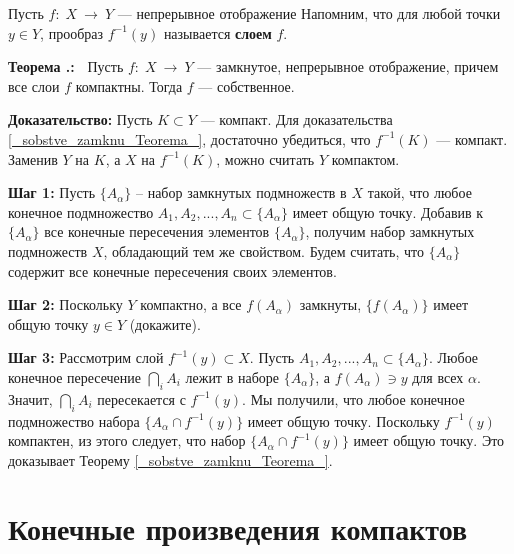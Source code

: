 \documentclass[12pt]{book}
\newcommand{\arrow}{{\:\longrightarrow\:}}
\def\endproof{\hbox{\vrule width 5pt height 5pt depth 0pt}}
\theoremstyle{upshape}
\theoremstyle{generic}
\theoremstyle{upshapenonumber}
\newcommand{\следствие}{%
     \refstepcounter{teorema}
     {\noindent\bf Следствие \thechapter.\arabic{teorema}:\ }}
\newcommand{\пример}{%
     \refstepcounter{teorema}
     {\noindent\bf Пример \thechapter.\arabic{teorema}:\ }}
\newcommand{\лемма}{%
     \refstepcounter{teorema}
     {\noindent\bf Лемма \thechapter.\arabic{teorema}:\ }}
\newcommand{\теорема}{%
     \refstepcounter{teorema}
     {\noindent\bf Теорема \thechapter.\arabic{teorema}:\ }}
\newcommand{\утверждение}{%
     \refstepcounter{teorema}
     {\noindent\bf Утверждение \thechapter.\arabic{teorema}:\ }}
\def\хфилл{\hfill}
\def\ноиндент{\noindent}
\def\бф{\bf}
\begin{document}
Пусть $f:\; X \arrow Y$ --- непрерывное отображение
Напомним, что для любой точки $y\in Y$, прообраз
$f^{-1}(y)$ называется {\бф слоем} $f$.

\хфилл


\теорема\label{_sobstve_zamknu_Teorema_}
Пусть $f:\; X \arrow Y$ --- замкнутое, непрерывное отображение,
причем все слои $f$ компактны. Тогда $f$ --- собственное.

\хфилл

\ноиндент
{\бф Доказательство:} 
Пусть $K\subset Y$ --- компакт.
Для доказательства \ref{_sobstve_zamknu_Teorema_},
достаточно убедиться, что $f^{-1}(K)$ --- компакт.
Заменив $Y$ на $K$, а $X$ на $f^{-1}(K)$, 
можно считать $Y$ компактом.

\хфилл

\ноиндент
{\бф Шаг 1:} Пусть $\{A_\alpha\}$ --
набор замкнутых подмножеств в $X$ такой, что любое конечное
подмножество $A_1, A_2, ... , A_n \subset \{A_\alpha\}$
имеет общую точку. Добавив к $\{A_\alpha\}$
все конечные пересечения элементов $\{A_\alpha\}$,
получим набор замкнутых подмножеств $X$,
обладающий тем же свойством. Будем считать,
что $\{A_\alpha\}$ содержит все конечные
пересечения своих элементов.

\хфилл

\ноиндент
{\бф Шаг 2:}
Поскольку $Y$ компактно, а все $f(A_\alpha)$
замкнуты, $\{ f(A_\alpha)\}$ имеет 
общую точку $y\in Y$ (докажите). 

\хфилл

\ноиндент
{\бф Шаг 3:} Рассмотрим слой $f^{-1}(y) \subset X$.
Пусть  $A_1, A_2, ... , A_n \subset \{A_\alpha\}$.
Любое конечное пересечение $\bigcap_i A_i$
лежит в наборе $\{A_\alpha\}$, а
$f(A_\alpha)\ni y$ для всех $\alpha$.
Значит, $\bigcap_i A_i$ пересекается с $f^{-1}(y)$.
Мы получили, что любое конечное подмножество
набора $\{A_\alpha\cap f^{-1}(y)\}$
имеет общую точку. Поскольку $f^{-1}(y)$
компактен, из этого следует, что  набор
$\{A_\alpha\cap f^{-1}(y)\}$ имеет
общую точку. Это доказывает Теорему \ref{_sobstve_zamknu_Teorema_}. 
\endproof



\section{Конечные произведения компактов}

\end{document}
